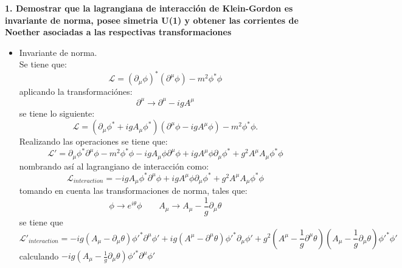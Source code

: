 \textbf{1. Demostrar que la lagrangiana de interacción de Klein-Gordon es invariante de norma, posee simetria U(1) y obtener
las corrientes de Noether asociadas a las respectivas transformaciones}
\begin{itemize}
    \item Invariante de norma.\\
    Se tiene que:
    \begin{equation*}
        \mathcal{L}= \left(\partial_\mu \phi \right)^* \left(\partial^\mu \phi\right) - m^2\phi^*\phi
    \end{equation*}
    aplicando la transformaciónes:
    \begin{equation*}
        \partial^\mu \rightarrow \partial^\mu-igA^\mu 
    \end{equation*}
    se tiene lo siguiente:
    \begin{equation*}
        \mathcal{L}= \left(\partial_\mu\phi^*+igA_\mu  \phi^*\right)
        \left(\partial^\mu \phi-igA^\mu \phi \right)-m^2 \phi^* \phi .
    \end{equation*}
    Realizando las operaciones se tiene que:
    \begin{equation*}
        {\mathcal{L}}'= \partial_\mu \phi^* \partial^\mu \phi -m^2 \phi^* \phi -ig A_\mu \phi \partial^\mu \phi +ig A^\mu \phi \partial_\mu \phi^* + g^2 A^\mu A_\mu \phi^* \phi
    \end{equation*}
    nombrando así al lagrangiano de interacción como:
    \begin{equation*}
        \mathcal{L}_{interaction}=-ig A_\mu \phi^* \partial^\mu \phi +ig A^\mu \phi \partial_\mu \phi^* + g^2 A^\mu A_\mu \phi^* \phi
    \end{equation*}
    tomando en cuenta las transformaciones de norma, tales que:
    \begin{equation*}
        \phi \rightarrow e^{i\theta} \phi \qquad A_\mu \rightarrow A_\mu- \frac{1}{g}\partial_\mu \theta
    \end{equation*}
    se tiene que
    \begin{equation*}
        {\mathcal{L}}'_{interaction}=-ig \left(A_\mu- \partial_\mu \theta\right) {\phi}'^* \partial^\mu {\phi}' +ig \left(A^\mu- \partial^\mu \theta\right) {\phi}'^* \partial_\mu {\phi}' + g^2 \left(A^\mu- \frac{1}{g}\partial^\mu \theta\right) \left(A_\mu- \frac{1}{g}\partial_\mu \theta\right) {\phi}'^* {\phi}'
    \end{equation*}
    calculando $-ig \left(A_\mu- \frac{1}{g}\partial_\mu \theta\right) {\phi}'^* \partial^\mu {\phi}'$

\end{itemize}
